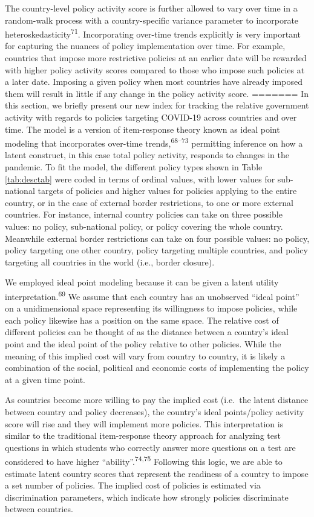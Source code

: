 \documentclass[]{article}
\begin{document}
The country-level policy activity score is further allowed to vary over time in a random-walk process with a country-specific variance parameter to incorporate heteroskedasticity\textsuperscript{71}. Incorporating over-time trends explicitly is very important for capturing the nuances of policy implementation over time. For example, countries that impose more restrictive policies at an earlier date will be rewarded with higher policy activity scores compared to those who impose such policies at a later date. Imposing a given policy when most countries have already imposed them will result in little if any change in the policy activity score.
=======
In this section, we briefly present our new index for tracking the relative government activity with regards to policies targeting COVID-19 across countries and over time. The model is a version of item-response theory known as ideal point modeling that incorporates over-time trends,\textsuperscript{68--73} permitting inference on how a latent construct, in this case total policy activity, responds to changes in the pandemic. To fit the model, the different policy types shown in Table \ref{tab:desctab} were coded in terms of ordinal values, with lower values for sub-national targets of policies and higher values for policies applying to the entire country, or in the case of external border restrictions, to one or more external countries. For instance, internal country policies can take on three possible values: no policy, sub-national policy, or policy covering the whole country. Meanwhile external border restrictions can take on four possible values: no policy, policy targeting one other country, policy targeting multiple countries, and policy targeting all countries in the world (i.e., border closure).

We employed ideal point modeling because it can be given a latent utility interpretation.\textsuperscript{69} We assume that each country has an unobserved ``ideal point'' on a unidimensional space representing its willingness to impose policies, while each policy likewise has a position on the same space. The relative cost of different policies can be thought of as the distance between a country's ideal point and the ideal point of the policy relative to other policies. While the meaning of this implied cost will vary from country to country, it is likely a combination of the social, political and economic costs of implementing the policy at a given time point.

As countries become more willing to pay the implied cost (i.e.~the latent distance between country and policy decreases), the country's ideal points/policy activity score will rise and they will implement more policies. This interpretation is similar to the traditional item-response theory approach for analyzing test questions in which students who correctly answer more questions on a test are considered to have higher ``ability''.\textsuperscript{74,75} Following this logic, we are able to estimate latent country scores that represent the readiness of a country to impose a set number of policies. The implied cost of policies is estimated via discrimination parameters, which indicate how strongly policies discriminate between countries.
\end{document}
